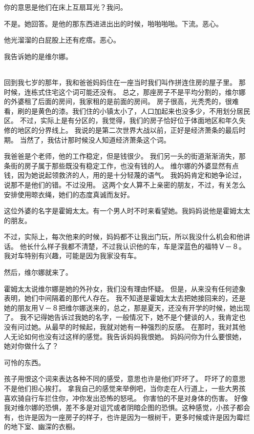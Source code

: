 \documentclass[UTF8]{ctexart}
\begin{document}
你的意思是他们在床上互扇耳光？我问。

不是。她回答。是他的那东西进进出出的时候，啪啪啪啪。下流。恶心。

他光溜溜的白屁股上还有疙瘩。恶心。

我告诉她的是维尔娜。

~\\

回到我七岁的那年，我和爸爸妈妈住在一座当时我们叫作拼连住房的屋子里。
那时候，连栋式住宅这个词可能还没有。
总之，那座房子不是平均分割的，维尔娜的外婆租了后面的房间，我家租的是前面的房间。
房子很高，光秃秃的，很难看，刷的是黄色的漆。我们住的小镇太小了，人口加起来也没多少，不用划分居民区。
不过，实际上是有分区的，我觉得，我们的房子恰好位于体面地区和年久失修的地区的分界线上。
我说的是第二次世界大战以前，正好是经济萧条的最后时期。
当然了，我估计那时候没人知道经济萧条这个词。

我爸爸是个老师，他的工作稳定，但是钱很少。
我们另一头的街道渐渐消失，那条街的房子属于那些既没有稳定工作，也没有钱的人。
维尔娜的外婆显然有点钱，因为她说起领救济的人，用的是十分轻蔑的语气。
我妈妈肯定和她争论过，说那不是他们的错。不过没用。
这两个女人算不上亲密的朋友，不过，有关怎么安排使用晾衣绳，她们的态度真诚而友好。

这位外婆的名字是霍姆太太。有一个男人时不时来看望她。我妈妈说他是霍姆太太的朋友。

不过，实际上，每次他来的时候，妈妈都不让我出门玩，所以我没什么机会和他讲话。
他长什么样子我都不清楚，不过我认识他的车，车是深蓝色的福特Ｖ－８。
我对车特别有兴趣，可能是因为我家没有车。

然后，维尔娜就来了。

霍姆太太说维尔娜是她的外孙女，我们没有理由怀疑。
但是，从来没有任何迹象表明，她们中间隔着的那代人存在。
我不知道是霍姆太太去把她接回来的，还是她的朋友用Ｖ－８把维尔娜送来的，总之，那是夏天，还没有开学的时候，她出现了。
我不记得她告诉过我她的名字，一般情况下，她不是个健谈的人，我肯定也没有问过她。从最早的时候起，我就对她有一种强烈的反感。
在那时，我对其他人无论如何也没有过这样的感觉。我告诉妈妈我恨她。
妈妈问你为什么要恨她，她对你做什么了？

可怜的东西。

孩子用恨这个词来表达各种不同的感受，意思也许是他们吓坏了。
吓坏了的意思不是他们担心挨打。
拿我自己的感觉来举例吧，当你走在人行道上，一些大男孩喜欢骑自行车拦住你，冲你发出恐怖的怒吼。
你害怕的不是对身体的伤害。
好像我对维尔娜的恐惧，差不多是对诅咒或者阴暗企图的恐惧。这种感觉，小孩子都会有，也许是因为一座房子的样子，也许是因为一根树干，更多时候或许是因为霉烂的地下室、幽深的衣橱。
\end{document}
